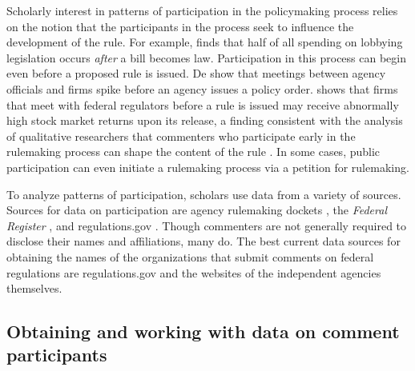 \documentclass[
      12pt,
        ]{article}
\begin{document}
Scholarly interest in patterns of participation in the policymaking
process relies on the notion that the participants in the process seek
to influence the development of the rule. For example,
\citet{YouJOP2017} finds that half of all spending on lobbying
legislation occurs \emph{after} a bill becomes law. Participation in
this process can begin even before a proposed rule is issued. De
\citet{deFigureidoKimICC2004} show that meetings between agency
officials and firms spike before an agency issues a policy order.
\citet{LibgoberQJPS} shows that firms that meet with federal regulators
before a rule is issued may receive abnormally high stock market returns
upon its release, a finding consistent with the analysis of qualitative
researchers that commenters who participate early in the rulemaking
process can shape the content of the rule \citep{NaughtonJPAM2009}. In
some cases, public participation can even initiate a rulemaking process
via a petition for rulemaking.

To analyze patterns of participation, scholars use data from a variety
of sources. Sources for data on participation are agency rulemaking
dockets
\citep[\citet{YackeeJPART2006},\citet{YoungBP2017},\citet{BanBP2019}]{GoldenJPART1998},
the \emph{Federal Register} \citep[\citet{WestPAR2004}]{BallaAPSR1998},
and regulations.gov \citep{GordonRashinJOP}. Though commenters are not
generally required to disclose their names and affiliations, many do.
The best current data sources for obtaining the names of the
organizations that submit comments on federal regulations are
regulations.gov and the websites of the independent agencies themselves.

\hypertarget{obtaining-and-working-with-data-on-comment-participants}{%
\subsection*{Obtaining and working with data on comment
participants}\label{obtaining-and-working-with-data-on-comment-participants}}
\end{document}
